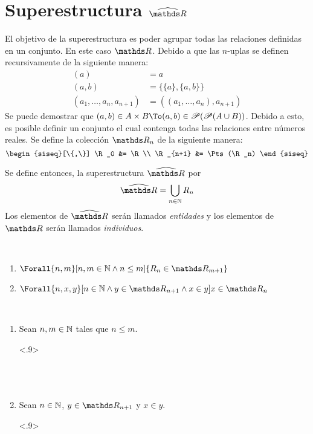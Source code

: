 \section{Superestructura \texorpdfstring{$\Rh$}{R}}

El objetivo de la superestructura es poder agrupar todas las relaciones
definidas en un conjunto. En este caso $\R$. Debido a que las
$n$-uplas se definen recursivamente de la siguiente manera:
\begin{align*}
  (a) &= a\\
  (a,b) &= \{\{a\}, \{a,b\}\}\\
  (a_1, \dots, a_n, a_{n+1}) &= ((a_1, \dots, a_n), a_{n+1})
\end{align*}
Se puede demostrar que $(a,b) \in A\times B \To
(a,b) \in \Pts(\Pts(A \cup B))$. Debido a esto, es posible definir un
conjunto el cual contenga todas las relaciones entre números reales. Se
define la colección $\R_n$ de la siguiente manera:
\[
  \begin{siseq}[\{,\}]
    \R_0 &= \R\\
    \R_{n+1} &= \Pts(\R_n)
  \end{siseq}
\]

Se define entonces, la superestructura $\Rh$ por
\[\Rh = \bigcup_{n\in\N} R_n\]
Los elementos de $\Rh$ serán llamados \emph{entidades} y los elementos
de $\R$ serán llamados \emph{individuos}.

\begin{lemma}~
  \begin{enumerate}
    \item $\Forall{n,m}[n,m\in\N \land n \leq m]{R_n \in \R_{m+1}}$
    \item $\Forall{n,x,y}[n\in\N \land y\in\R_{n+1} \land x\in y]{x\in\R_n}$
  \end{enumerate}
\end{lemma}
\pagebreak
\begin{demo}~
  \begin{enumerate}
    \item Sean $n,m \in \mathbb{N}$ tales que $n \leq m$.
          \begin{longderivation}<.9>
              \\
            \equiv\\
              \\
            \equiv\\
          \end{longderivation}
    \item Sean $n\in\mathbb{N}$, $y\in\R_{n+1}$ y $x\in y$.
          \begin{longderivation}<.9>
              \\
            \equiv\\
              \\
            \To\\
          \end{longderivation}
  \end{enumerate}
\end{demo}
